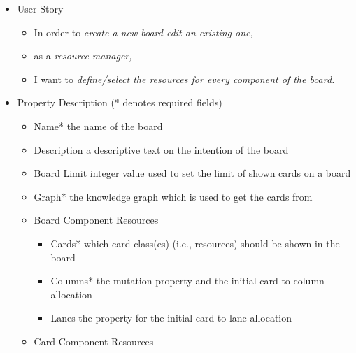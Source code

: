 \begin{itemize}[after=\vspace{1em}]\label{FR1}
    \setlength\itemsep{-0.5em}
	\item[] User Story\\[-7.8mm]
	\begin{itemize}
    \setlength\itemsep{-0.5em}
        \item[] In order to \textit{create a new board  edit an existing one,}
        \item[] as a \textit{resource manager,}
        \item[] I want to \textit{define/select the resources for every component of the board.}
    \end{itemize}
    \vspace*{2mm}
    \item[] Property \tabto*{36.5mm} Description (* denotes required fields)\\[-7mm]
	\begin{itemize}
    \setlength\itemsep{-0.5em}
        \item \small{Name* \tabto*{28mm} the name of the board}
        \item \small{Description \tabto*{28mm} a descriptive text on the intention of the board}
        \item \small{Board Limit \tabto*{28mm} integer value used to set the limit of shown cards on a board}
        \item \small{Graph* \tabto*{28mm} the knowledge graph which is used to get the cards from}
        \vspace*{0.3em}
        \item[] \small{Board Component Resources}
        \begin{itemize}[before=\vspace*{-.5em}]
        \setlength\itemsep{-0.5em}
        \item \small{Cards* \tabto*{20.8mm} which card class(es) (i.e., resources) should be shown in the board}
        \item \small{Columns* \tabto*{20.8mm} the mutation property and the initial card-to-column allocation}
        \item \small{Lanes \tabto*{20.8mm} the property for the initial card-to-lane allocation}
        \end{itemize}
        \vspace*{0.3em}
        \item[] \small{Card Component Resources}
        \begin{itemize}[before=\vspace*{-.5em}]

\end{itemize}
\end{itemize}
\end{itemize}
